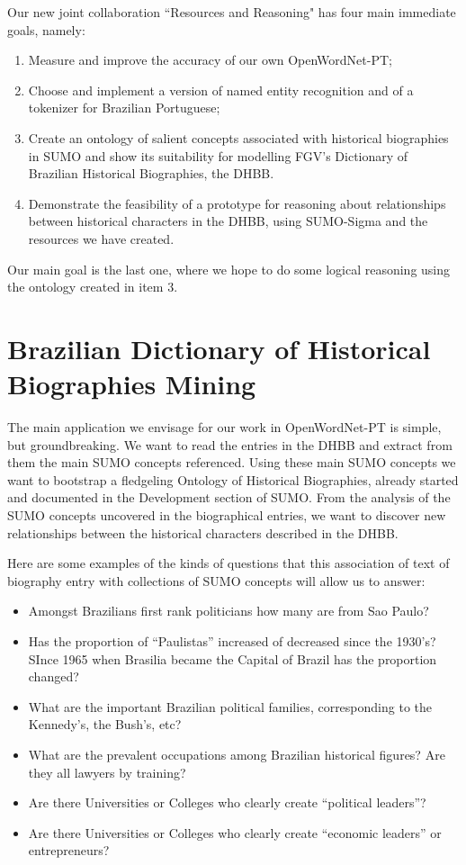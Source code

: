 Our new joint collaboration ``Resources and Reasoning" has four main
immediate goals, namely:

\begin{enumerate}
\item Measure and improve the accuracy of our own OpenWordNet-PT;

\item Choose and implement a version of named entity recognition and
  of a tokenizer for Brazilian Portuguese;

\item Create an ontology of salient concepts associated with
  historical biographies in SUMO and show its suitability for
  modelling FGV's Dictionary of Brazilian Historical Biographies, the
  DHBB.

\item Demonstrate the feasibility of a prototype for reasoning about
  relationships between historical characters in the DHBB, using
  SUMO-Sigma and the resources we have created.
\end{enumerate}

Our main goal is the last one, where we hope to do some logical
reasoning using the ontology created in item 3.

\section{Brazilian Dictionary of Historical Biographies Mining}

The main application we envisage for our work in OpenWordNet-PT is
simple, but groundbreaking.  We want to read the entries in the DHBB
and extract from them the main SUMO concepts referenced.  Using these
main SUMO concepts we want to bootstrap a fledgeling Ontology of
Historical Biographies, already started and documented in the
Development section of SUMO.  From the analysis of the SUMO concepts
uncovered in the biographical entries, we want to discover new
relationships between the historical characters described in the DHBB.

Here are some examples of the kinds of questions that this association
of text of biography entry with collections of SUMO concepts will
allow us to answer:

\begin{itemize}
\item Amongst Brazilians first rank politicians how many are from Sao
  Paulo?
\item Has the proportion of ``Paulistas'' increased of decreased since
  the 1930's? SInce 1965 when Brasilia became the Capital of Brazil
  has the proportion changed?
\item What are the important Brazilian political families,
  corresponding to the Kennedy's, the Bush's, etc?
\item What are the prevalent occupations among Brazilian historical
  figures? Are they all lawyers by training?
\item Are there Universities or Colleges who clearly create
  ``political leaders''?
\item Are there Universities or Colleges who clearly create ``economic
  leaders'' or entrepreneurs?
\end{itemize}

